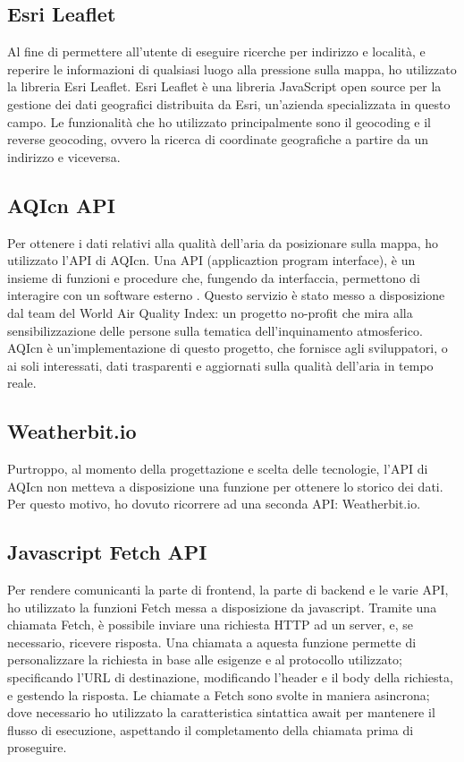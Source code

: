 \subsection{Esri Leaflet}
Al fine di permettere all'utente di eseguire ricerche per indirizzo e località, e reperire le informazioni di qualsiasi luogo alla pressione sulla mappa, ho utilizzato la libreria Esri Leaflet.
Esri Leaflet è una libreria JavaScript open source per la gestione dei dati geografici distribuita da Esri, un'azienda specializzata in questo campo.
Le funzionalità che ho utilizzato principalmente sono il geocoding e il reverse geocoding, ovvero la ricerca di coordinate geografiche a partire da un indirizzo e viceversa.

\subsection{AQIcn API}
Per ottenere i dati relativi alla qualità dell'aria da posizionare sulla mappa, ho utilizzato l'API di AQIcn.
Una API (applicaztion program interface), è un insieme di funzioni e procedure che, fungendo da interfaccia, permettono di interagire con un software esterno \cite{api}.
Questo servizio è stato messo a disposizione dal team del World Air Quality Index: un progetto no-profit che mira alla sensibilizzazione delle persone sulla tematica dell'inquinamento atmosferico.
AQIcn è un'implementazione di questo progetto, che fornisce agli sviluppatori, o ai soli interessati, dati trasparenti e aggiornati sulla qualità dell'aria in tempo reale.

\subsection{Weatherbit.io}
Purtroppo, al momento della progettazione e scelta delle tecnologie, l'API di AQIcn non metteva a disposizione una funzione per ottenere lo storico dei dati.
Per questo motivo, ho dovuto ricorrere ad una seconda API: Weatherbit.io.

\subsection{Javascript Fetch API}
Per rendere comunicanti la parte di frontend, la parte di backend e le varie API, ho utilizzato la funzioni Fetch messa a disposizione da javascript.
Tramite una chiamata Fetch, è possibile inviare una richiesta HTTP ad un server, e, se necessario, ricevere risposta.
Una chiamata a aquesta funzione permette di personalizzare la richiesta in base alle esigenze e al protocollo utilizzato; specificando l'URL di destinazione, modificando l'header e il body della richiesta, e gestendo la risposta.
Le chiamate a Fetch sono svolte in maniera asincrona; dove necessario ho utilizzato la caratteristica sintattica await per mantenere il flusso di esecuzione, aspettando il completamento della chiamata prima di proseguire.

